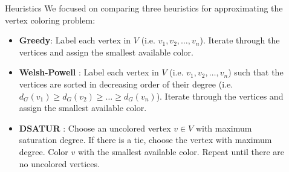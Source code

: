 \documentclass[final]{beamer}
\newlength{\sepwid}
\newlength{\smallsepwid}
\newlength{\onecolwid}
\newlength{\twocolwid}
\newlength{\halfcolwid}
\begin{document}
\begin{frame}[t]
\begin{columns}[t]

  \begin{column}{\sepwid}\end{column}			%

  \begin{column}{\twocolwid}

    \begin{columns}
      \begin{column}{\halfcolwid}
        \begin{block}{Heuristics}
          We focused on comparing three heuristics for approximating the vertex coloring problem:
          \begin{itemize}
            \setlength\itemsep{0.4em}
            \item \textbf{Greedy}: Label each vertex in $V$ (i.e. $v_1,v_2,\ldots,v_n$). Iterate through the vertices and assign the smallest available color.
            \item \textbf{Welsh-Powell} \cite{welsh}: Label each vertex in $V$ (i.e. $v_1,v_2,\ldots,v_n$) such that the vertices are sorted in decreasing order of their degree (i.e. $d_G(v_1) \geq d_G(v_2) \geq \ldots \geq d_G(v_n) $). Iterate through the vertices and assign the smallest available color.
            \item \textbf{DSATUR} \cite{brelaz}: Choose an uncolored vertex $v \in V$ with maximum saturation degree. If there is a tie, choose the vertex with maximum degree. Color $v$ with the smallest available color. Repeat until there are no uncolored vertices.
          \end{itemize}
        \end{block}
      \end{column}

      \begin{column}{\smallsepwid}\end{column}			%


\end{columns}
\end{column}
\end{columns}
\end{frame}
\end{document}
